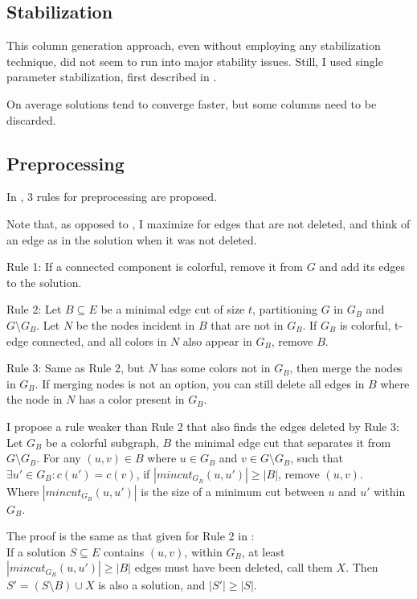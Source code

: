 \documentclass{article}
\begin{document}
\subsection{Stabilization}
This column generation approach, even without employing any stabilization technique,
did not seem to run into major stability issues.
Still, I used single parameter stabilization, first described in \parencite{sps}.

On average solutions tend to converge faster, but some columns need to be discarded.

\subsection{Preprocessing}
In \parencite{mop2012}, 3 rules for preprocessing are proposed.

Note that, as opposed to \parencite{mop2012}, I maximize for edges that are not deleted,
and think of an edge as in the solution when it was not deleted.

Rule 1:
If a connected component is colorful, remove it from $G$ and add its edges to the solution.

Rule 2:
Let $B \subseteq E$ be a minimal edge cut of size $t$, partitioning $G$ in $G_B$ and $G \setminus G_B$.
Let $N$ be the nodes incident in $B$ that are not in $G_B$.
If $G_B$ is colorful, t-edge connected, and all colors in $N$ also appear in $G_B$, remove $B$.

Rule 3:
Same as Rule 2, but $N$ has some colors not in $G_B$, then merge the nodes in $G_B$.
If merging nodes is not an option, you can still delete all edges in $B$ where the node in $N$ has a color present in $G_B$.

I propose a rule weaker than Rule 2 that also finds the edges deleted by Rule 3:\\
Let $G_B$ be a colorful subgraph, $B$ the minimal edge cut that separates it from $G \setminus G_B$.
For any $(u,v) \in B$ where $u \in G_B$ and $v \in G \setminus G_B$,
such that $\exists u' \in G_B : c(u') = c(v)$,
if $|mincut_{G_B}(u,u')| \ge |B|$, remove $(u,v)$.\\
Where $|mincut_{G_B}(u,u')|$ is the size of a minimum cut between $u$ and $u'$ within $G_B$.

The proof is the same as that given for Rule 2 in \parencite{mop2012}:\\
If a solution $S \subseteq E$ contains $(u,v)$, within $G_B$,
at least $|mincut_{G_B}(u,u')| \ge |B|$ edges must have been deleted, call them $X$.
Then $S' = (S \setminus B) \cup X$ is also a solution, and $|S'| \ge |S|$.
\end{document}
